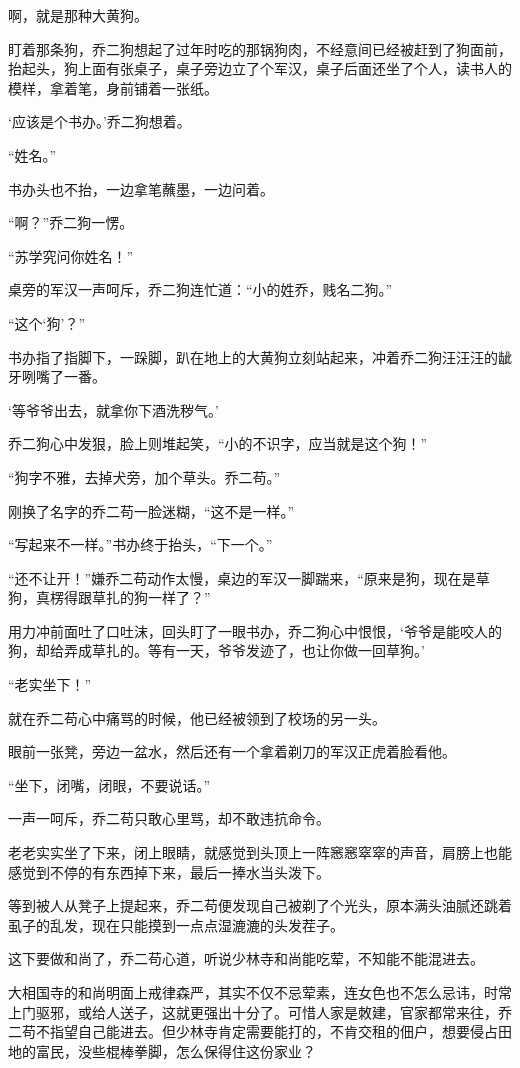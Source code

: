 啊，就是那种大黄狗。

盯着那条狗，乔二狗想起了过年时吃的那锅狗肉，不经意间已经被赶到了狗面前，抬起头，狗上面有张桌子，桌子旁边立了个军汉，桌子后面还坐了个人，读书人的模样，拿着笔，身前铺着一张纸。

‘应该是个书办。’乔二狗想着。

“姓名。”

书办头也不抬，一边拿笔蘸墨，一边问着。

“啊？”乔二狗一愣。

“苏学究问你姓名！”

桌旁的军汉一声呵斥，乔二狗连忙道：“小的姓乔，贱名二狗。”

“这个‘狗’？”

书办指了指脚下，一跺脚，趴在地上的大黄狗立刻站起来，冲着乔二狗汪汪汪的龇牙咧嘴了一番。

‘等爷爷出去，就拿你下酒洗秽气。’

乔二狗心中发狠，脸上则堆起笑，“小的不识字，应当就是这个狗！”

“狗字不雅，去掉犬旁，加个草头。乔二苟。”

刚换了名字的乔二苟一脸迷糊，“这不是一样。”

“写起来不一样。”书办终于抬头，“下一个。”

“还不让开！”嫌乔二苟动作太慢，桌边的军汉一脚踹来，“原来是狗，现在是草狗，真楞得跟草扎的狗一样了？”

用力冲前面吐了口吐沫，回头盯了一眼书办，乔二狗心中恨恨，‘爷爷是能咬人的狗，却给弄成草扎的。等有一天，爷爷发迹了，也让你做一回草狗。’

“老实坐下！”

就在乔二苟心中痛骂的时候，他已经被领到了校场的另一头。

眼前一张凳，旁边一盆水，然后还有一个拿着剃刀的军汉正虎着脸看他。

“坐下，闭嘴，闭眼，不要说话。”

一声一呵斥，乔二苟只敢心里骂，却不敢违抗命令。

老老实实坐了下来，闭上眼睛，就感觉到头顶上一阵窸窸窣窣的声音，肩膀上也能感觉到不停的有东西掉下来，最后一捧水当头泼下。

等到被人从凳子上提起来，乔二苟便发现自己被剃了个光头，原本满头油腻还跳着虱子的乱发，现在只能摸到一点点湿漉漉的头发茬子。

这下要做和尚了，乔二苟心道，听说少林寺和尚能吃荤，不知能不能混进去。

大相国寺的和尚明面上戒律森严，其实不仅不忌荤素，连女色也不怎么忌讳，时常上门驱邪，或给人送子，这就更强出十分了。可惜人家是敇建，官家都常来往，乔二苟不指望自己能进去。但少林寺肯定需要能打的，不肯交租的佃户，想要侵占田地的富民，没些棍棒拳脚，怎么保得住这份家业？

